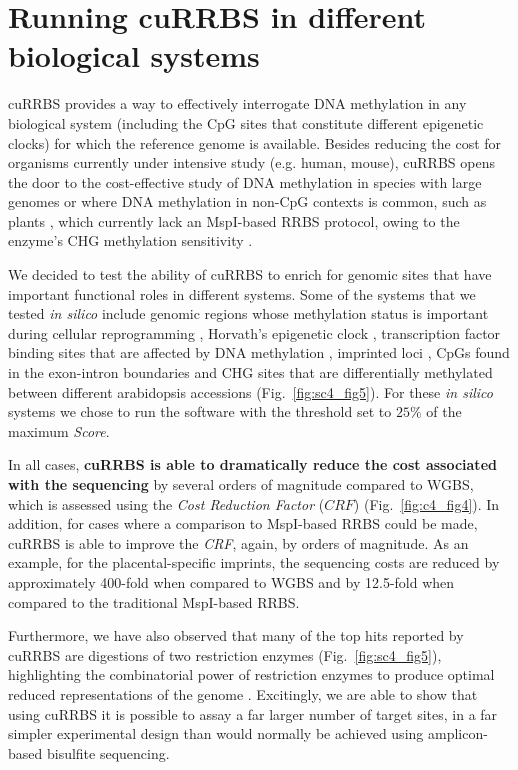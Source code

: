 \section{Running cuRRBS in different biological systems}

\smallskip

cuRRBS provides a way to effectively interrogate DNA methylation in any biological system (including the CpG sites that constitute different epigenetic clocks) for which the reference genome is available. Besides reducing the cost for organisms currently under intensive study (e.g. human, mouse), cuRRBS opens the door to the cost-effective study of DNA methylation in species with large genomes or where DNA methylation in non-CpG contexts is common, such as plants \cite{Stroud2013}, which currently lack an MspI-based RRBS protocol, owing to the enzyme’s CHG methylation sensitivity \cite{Sun2014}.

\bigskip

We decided to test the ability of cuRRBS to enrich for genomic sites that have important functional roles in different systems. Some of the systems that we tested \textit{in silico} include genomic regions whose methylation status is important during cellular reprogramming \cite{Milagre2017}, Horvath's epigenetic clock \cite{Horvath2013}, transcription factor binding sites that are affected by DNA methylation \cite{Maurano2015,Domcke2015}, imprinted loci \cite{Hanna2016}, CpGs found in the exon-intron boundaries \cite{LevMaor2015} and CHG sites that are differentially methylated between different arabidopsis accessions \cite{Kawakatsu2016} (Fig.~\ref{fig:sc4_fig5}). For these \textit{in silico} systems we chose to run the software with the threshold set to $25\%$ of the maximum \textit{Score}.

\bigskip

In all cases, \textbf{cuRRBS is able to dramatically reduce the cost associated with the sequencing} by several orders of magnitude compared to WGBS, which is assessed using the \textit{Cost Reduction Factor} ($CRF$) (Fig.~\ref{fig:c4_fig4}). In addition, for cases where a comparison to MspI-based RRBS could be made, cuRRBS is able to improve the \textit{CRF}, again, by orders of magnitude. As an example, for the placental-specific imprints, the sequencing costs are reduced by approximately 400-fold when compared to WGBS and by 12.5-fold when compared to the traditional MspI-based RRBS.

\bigskip

Furthermore, we have also observed that many of the top hits reported by cuRRBS are digestions of two restriction enzymes (Fig.~\ref{fig:sc4_fig5}), highlighting the combinatorial power of restriction enzymes to produce optimal reduced representations of the genome \cite{Bystrykh2013}. Excitingly, we are able to show that using cuRRBS it is possible to assay a far larger number of target sites, in a far simpler experimental design than would normally be achieved using amplicon-based bisulfite sequencing.


